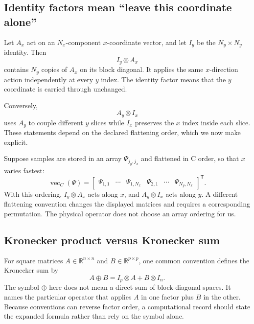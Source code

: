 \subsection{Identity factors mean ``leave this coordinate alone''}

Let \(A_x\) act on an \(N_x\)-component \(x\)-coordinate vector, and let
\(I_y\) be the \(N_y\times N_y\) identity. Then
\begin{equation}
  I_y\otimes A_x
\end{equation}
contains \(N_y\) copies of \(A_x\) on its block diagonal. It applies the same
\(x\)-direction action independently at every \(y\) index. The identity factor
means that the \(y\) coordinate is carried through unchanged.

Conversely,
\begin{equation}
  A_y\otimes I_x
\end{equation}
uses \(A_y\) to couple different \(y\) slices while \(I_x\) preserves the
\(x\) index inside each slice. These statements depend on the declared
flattening order, which we now make explicit.

Suppose samples are stored in an array \(\Psi_{j_y,j_x}\) and flattened in C
order, so that \(x\) varies fastest:
\begin{equation}
  \operatorname{vec}_C(\Psi)
  =
  \begin{bmatrix}
    \Psi_{1,1} & \cdots & \Psi_{1,N_x} &
    \Psi_{2,1} & \cdots & \Psi_{N_y,N_x}
  \end{bmatrix}^{\mathsf T}.
\end{equation}
With this ordering, \(I_y\otimes A_x\) acts along \(x\), and
\(A_y\otimes I_x\) acts along \(y\). A different flattening convention changes
the displayed matrices and requires a corresponding permutation. The physical
operator does not choose an array ordering for us.

\subsection{Kronecker product versus Kronecker sum}

For square matrices \(A\in\mathbb R^{n\times n}\) and
\(B\in\mathbb R^{p\times p}\), one common convention defines the Kronecker sum
by
\begin{equation}
  A\oplus B
  =I_p\otimes A+B\otimes I_n.
\end{equation}
The symbol \(\oplus\) here does not mean a direct sum of block-diagonal spaces.
It names the particular operator that applies \(A\) in one factor plus \(B\)
in the other. Because conventions can reverse factor order, a computational
record should state the expanded formula rather than rely on the symbol alone.


